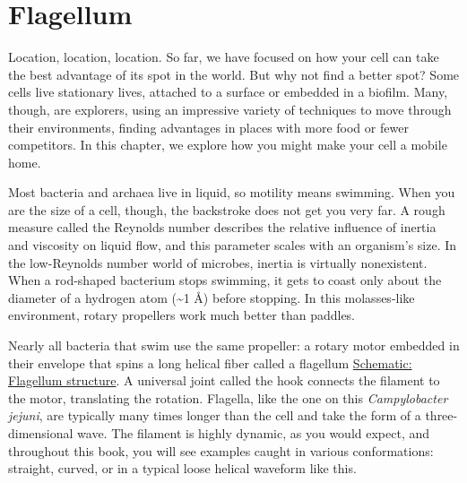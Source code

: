 \documentclass[]{tufte-book}
\begin{document}
\section{Flagellum}\label{flagellum}

Location, location, location. So far, we have focused on how your cell
can take the best advantage of its spot in the world. But why not find a
better spot? Some cells live stationary lives, attached to a surface or
embedded in a biofilm. Many, though, are explorers, using an impressive
variety of techniques to move through their environments, finding
advantages in places with more food or fewer competitors. In this
chapter, we explore how you might make your cell a mobile home.

Most bacteria and archaea live in liquid, so motility means swimming.
When you are the size of a cell, though, the backstroke does not get you
very far. A rough measure called the Reynolds number describes the
relative influence of inertia and viscosity on liquid flow, and this
parameter scales with an organism's size. In the low-Reynolds number
world of microbes, inertia is virtually nonexistent. When a rod-shaped
bacterium stops swimming, it gets to coast only about the diameter of a
hydrogen atom (\textasciitilde{}1 Å) before stopping. In this
molasses-like environment, rotary propellers work much better than
paddles.

Nearly all bacteria that swim use the same propeller: a rotary motor
embedded in their envelope that spins a long helical fiber called a
flagellum \protect\hyperlink{Flagellum_structure}{Schematic: Flagellum
structure}. A universal joint called the hook connects the filament to
the motor, translating the rotation. Flagella, like the one on this
\emph{Campylobacter jejuni}, are typically many times longer than the
cell and take the form of a three-dimensional wave. The filament is
highly dynamic, as you would expect, and throughout this book, you will
see examples caught in various conformations: straight, curved, or in a
typical loose helical waveform like this.
\end{document}
